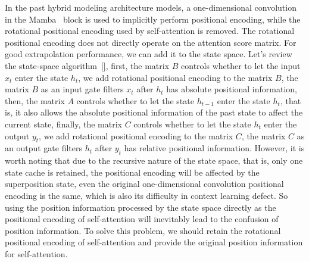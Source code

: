 \documentclass{article}
\theoremstyle{plain}
\theoremstyle{definition}
\theoremstyle{remark}
\begin{document}
In the past hybrid modeling architecture models, a one-dimensional convolution in the Mamba~\cite{gu2023mamba} block is used to implicitly perform positional encoding, while the rotational positional encoding used by self-attention is removed. The rotational positional encoding does not directly operate on the attention score matrix. For good extrapolation performance, we can add it to the state space. Let's review the state-space algorithm~\ref{}, first, the matrix $B$ controls whether to let the input $x_t$ enter the state $h_t$, we add rotational positional encoding to the matrix $B$, the matrix $B$ as an input gate filters $x_t$ after $h_t$ has absolute positional information, then, the matrix $A$ controls whether to let the state $h_{t-1}$ enter the state $h_t$, that is, it also allows the absolute positional information of the past state to affect the current state, finally, the matrix $C$ controls whether to let the state $h_t$ enter the output $y_t$, we add rotational positional encoding to the matrix $C$, the matrix $C$ as an output gate filters $h_t$ after $y_t$ has relative positional information. However, it is worth noting that due to the recursive nature of the state space, that is, only one state cache is retained, the positional encoding will be affected by the superposition state, even the original one-dimensional convolution positional encoding is the same, which is also its difficulty in context learning defect. So using the position information processed by the state space directly as the positional encoding of self-attention will inevitably lead to the confusion of position information. To solve this problem, we should retain the rotational positional encoding of self-attention and provide the original position information for self-attention.
\end{document}

